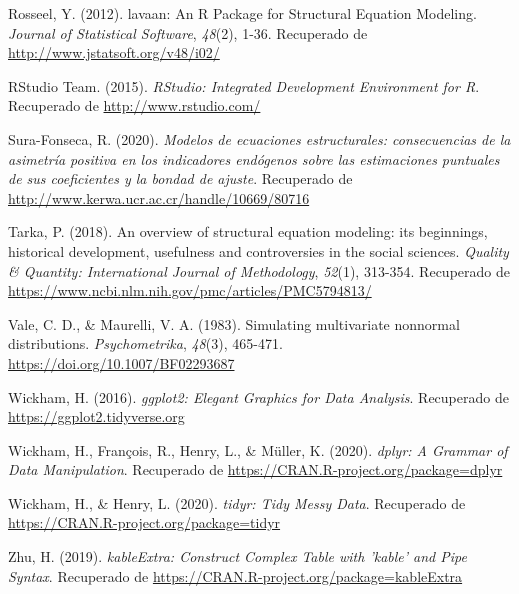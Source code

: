 \documentclass[
]{article}
\newlength{\cslhangindent}
\newenvironment{cslreferences}%
  {\setlength{\parindent}{0pt}%
  \everypar{\setlength{\hangindent}{\cslhangindent}}\ignorespaces}%
  {\par}
\begin{document}
\begin{cslreferences}
\leavevmode\hypertarget{ref-lavaan}{}%
Rosseel, Y. (2012). lavaan: An R Package for Structural Equation
Modeling. \emph{Journal of Statistical Software}, \emph{48}(2), 1-36.
Recuperado de \url{http://www.jstatsoft.org/v48/i02/}

\leavevmode\hypertarget{ref-RStudio}{}%
RStudio Team. (2015). \emph{RStudio: Integrated Development Environment
for R}. Recuperado de \url{http://www.rstudio.com/}

\leavevmode\hypertarget{ref-sura}{}%
Sura-Fonseca, R. (2020). \emph{Modelos de ecuaciones estructurales:
consecuencias de la asimetría positiva en los indicadores endógenos
sobre las estimaciones puntuales de sus coeficientes y la bondad de
ajuste}. Recuperado de
\url{http://www.kerwa.ucr.ac.cr/handle/10669/80716}

\leavevmode\hypertarget{ref-Tarka}{}%
Tarka, P. (2018). An overview of structural equation modeling: its
beginnings, historical development, usefulness and controversies in the
social sciences. \emph{Quality \& Quantity: International Journal of
Methodology}, \emph{52}(1), 313-354. Recuperado de
\url{https://www.ncbi.nlm.nih.gov/pmc/articles/PMC5794813/}

\leavevmode\hypertarget{ref-Vale1983}{}%
Vale, C. D., \& Maurelli, V. A. (1983). Simulating multivariate
nonnormal distributions. \emph{Psychometrika}, \emph{48}(3), 465-471.
\url{https://doi.org/10.1007/BF02293687}

\leavevmode\hypertarget{ref-ggplot2}{}%
Wickham, H. (2016). \emph{ggplot2: Elegant Graphics for Data Analysis}.
Recuperado de \url{https://ggplot2.tidyverse.org}

\leavevmode\hypertarget{ref-dplyr}{}%
Wickham, H., François, R., Henry, L., \& Müller, K. (2020). \emph{dplyr:
A Grammar of Data Manipulation}. Recuperado de
\url{https://CRAN.R-project.org/package=dplyr}

\leavevmode\hypertarget{ref-tidyr}{}%
Wickham, H., \& Henry, L. (2020). \emph{tidyr: Tidy Messy Data}.
Recuperado de \url{https://CRAN.R-project.org/package=tidyr}

\leavevmode\hypertarget{ref-kableExtra}{}%
Zhu, H. (2019). \emph{kableExtra: Construct Complex Table with 'kable'
and Pipe Syntax}. Recuperado de
\url{https://CRAN.R-project.org/package=kableExtra}
\end{cslreferences}
\end{document}
